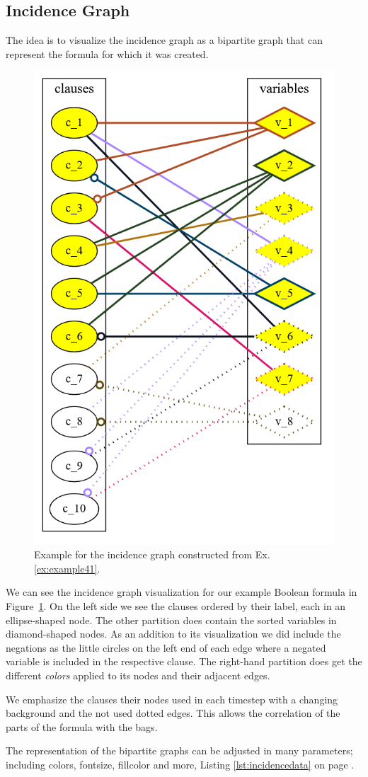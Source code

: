 \documentclass[a4paper, 12pt, bibliography=totoc]{scrartcl}
\begin{document}
\subsection{Incidence Graph}\label{sec:incid}

The idea is to visualize the incidence graph as a bipartite graph that can represent the formula for which it was created.

\begin{figure}[H]
	\centering
	\includegraphics[width=0.4\linewidth]{images/IncidenceStep6.png}
	\caption{Example for the incidence graph constructed from Ex. \ref{ex:example41}.}
	\label{fig:incidencestep6}
\end{figure}

 We can see the incidence graph visualization for our example Boolean formula in Figure~\ref{fig:incidencestep6}. On the left side we see the clauses ordered by their label, each in an ellipse-shaped node. The other partition does contain the sorted variables in diamond-shaped nodes. As an addition to its visualization we did include the negations as the little circles on the left end of each edge where a negated variable is included in the respective clause. The right-hand partition does get the different \textit{colors} applied to its nodes and their adjacent edges.
 
 We emphasize the clauses their nodes used in each timestep with a changing background and the not used dotted edges. This allows the correlation of the  parts of the formula with the bags.  

The representation of the bipartite graphs can be adjusted in many parameters; including colors, fontsize, fillcolor and more, Listing \ref{lst:incidencedata} on page \pageref{lst:incidencedata}.
\end{document}
